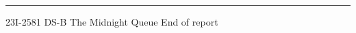 \documentclass[10pt,a4paper]{article}
\begin{document}
\vfill
{\color{ink!15}\rule{\linewidth}{0.5pt}}\par
\vspace{2pt}
{\fontsize{6.8}{8}\selectfont\color{muted}%
23I-2581 \textperiodcentered{} DS-B \textperiodcentered{} The Midnight Queue
\textperiodcentered{} End of report}\par

\label{LastPage}
\end{document}
